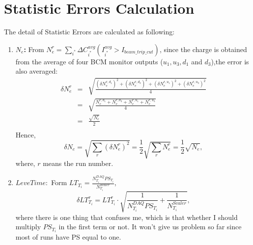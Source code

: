 \section{Statistic Errors Calculation}
The detail of Statistic Errors are calculated as following:
\begin{enumerate}

\item \textbf{$N_{e}$:} From $N_{e}^{r} = \sum_{i^{*}} \Delta C_{i^{*}}^{avg}(I_{i^{*}}^{avg}>I_{beam\_trip\_cut})$, since the charge is obtained from the average of four BCM monitor outputs ($u_{1},u_{3},d_{1}$ and $d_{3}$),the error is also averaged:
\begin{eqnarray*}
  \delta N_{e}^{r} &=& \sqrt{\frac{(\delta N_{e}^{r,d_{1}})^{2}+(\delta N_{e}^{r,d_{3}})^{2}+(\delta N_{e}^{r,u_{1}})^{2}+(\delta N_{e}^{r,u_{3}})^{2}}{4}}\\
                  &=& \sqrt{\frac{N_{e}^{r,d_{1}}+N_{e}^{r,d_{3}}+N_{e}^{r,u_{1}}+N_{e}^{r,u_{3}}}{4}}\\
                  &=& \frac{\sqrt{N_{e}^{r}}}{2} \\
\end{eqnarray*}
Hence,
\begin{equation}
  \delta N_{e} = \sqrt{\sum_{r}(\delta N_{e}^{r})^{2}}=\frac{1}{2}\sqrt{\sum_{r}N_{e}^{r}}=\frac{1}{2}\sqrt{N_{e}},
\end{equation}
where, $r$ means the run number.

\item \textbf{$Leve Time:$} Form $LT_{T_{i}} = \frac{N_{T_{i}}^{DAQ} PS_{T_{i}}}{N_{T_{i}}^{Scaler}}$,
\begin{equation}
  \delta LT^{r}_{T_{i}} = LT^{r}_{T_{i}} \cdot \sqrt{\frac{1}{N_{T_{i}}^{DAQ} PS_{T_{i}}}+\frac{1}{N_{T_{i}}^{Scaler}}},
\end{equation}
where there is one thing that confuses me, which is that whether I should multiply $PS_{T_{i}}$ in the first term or not. It won't give us problem so far since most of runs have PS equal to one.


\end{enumerate}
